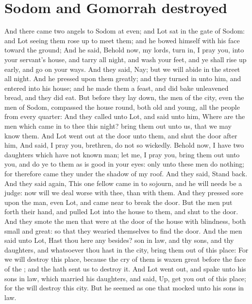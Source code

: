 \section*{Sodom and Gomorrah destroyed}
\begin{biblechapter} %
\verse And there came two angels to Sodom at even; and Lot sat in the gate of Sodom: and Lot seeing them rose up to meet them; and he bowed himself with his face toward the ground;
\verse And he said, Behold now, my lords, turn in, I pray you, into your servant's house, and tarry all night, and wash your feet, and ye shall rise up early, and go on your ways. And they said, Nay; but we will abide in the street all night.
\verse And he pressed upon them greatly; and they turned in unto him, and entered into his house; and he made them a feast, and did bake unleavened bread, and they did eat.
\verse But before they lay down, the men of the city, even the men of Sodom, compassed the house round, both old and young, all the people from every quarter:
\verse And they called unto Lot, and said unto him, Where are the men which came in to thee this night? bring them out unto us, that we may know them.
\verse And Lot went out at the door unto them, and shut the door after him,
\verse And said, I pray you, brethren, do not so wickedly.
\verse Behold now, I have two daughters which have not known man; let me, I pray you, bring them out unto you, and do ye to them as is good in your eyes: only unto these men do nothing; for therefore came they under the shadow of my roof.
\verse And they said, Stand back. And they said again, This one fellow came in to sojourn, and he will needs be a judge: now will we deal worse with thee, than with them. And they pressed sore upon the man, even Lot, and came near to break the door.
\verse But the men put forth their hand, and pulled Lot into the house to them, and shut to the door.
\verse And they smote the men that were at the door of the house with blindness, both small and great: so that they wearied themselves to find the door.
\verse And the men said unto Lot, Hast thou here any besides? son in law, and thy sons, and thy daughters, and whatsoever thou hast in the city, bring them out of this place:
\verse For we will destroy this place, because the cry of them is waxen great before the face of the \LORD; and the \LORD hath sent us to destroy it.
\verse And Lot went out, and spake unto his sons in law, which married his daughters, and said, Up, get you out of this place; for the \LORD will destroy this city. But he seemed as one that mocked unto his sons in law.

\end{biblechapter}

